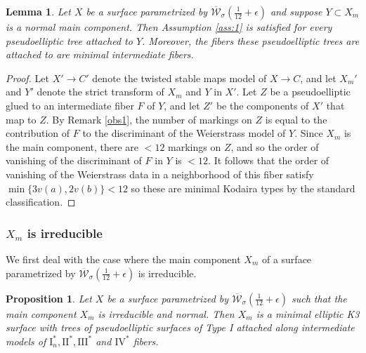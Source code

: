 \documentclass[11pt]{amsart}
\newtheorem{lemma}[theorem]{Lemma}
\newtheorem{prop}[theorem]{Proposition}
\theoremstyle{definition}
\theoremstyle{remark}
\newcommand{\calW}{\mathcal W}
\newcommand{\ktwelve}{\overline{\calW}_\sigma({\frac{1}{12}+\epsilon})}
\begin{document}
	
	\begin{lemma}\label{lem:sing:noass1} Let $X$ be a surface parametrized by $\ktwelve$ and suppose $Y \subset X_m$ is a normal main component. Then Assumption \ref{ass:1} is satisfied for every pseudoelliptic tree attached to $Y$. Moreover, the fibers these pseudoelliptic trees are attached to are minimal intermediate fibers. 
	\end{lemma} 
	\begin{proof} 
		Let $X' \to C'$ denote the twisted stable maps model of $X \to C$, and let $X_m'$ and $Y'$ denote the strict transform of $X_m$ and $Y$ in $X'$. Let $Z$ be a pseudoelliptic glued to an intermediate fiber $F$ of $Y$, and let $Z'$ be the components of $X'$ that map to $Z$. By Remark \ref{obs1}, the number of markings on $Z$ is equal to the contribution of $F$ to the discriminant of the Weierstrass model of $Y$. Since $X_m$ is the main component, there are   $< 12$ markings on $Z$, and so the order of vanishing of the discriminant of $F$ in $Y$ is $<12$. It follows that the order of vanishing of the Weierstrass data in a neighborhood of this fiber satisfy $\min\{3v(a), 2v(b)\} < 12$ so these are minimal Kodaira types by the standard classification. \end{proof}
	
	
	\subsubsection{$X_m$ is irreducible} We first deal with the case where the main component $X_m$ of a surface parametrized by $\ktwelve$ is irreducible. 
	
	\begin{prop}\label{prop:singlenormal12}
		Let $X$ be a surface parametrized by $\ktwelve$ such that the main component $X_m$ is irreducible and normal. Then $X_m$ is a minimal elliptic K3 surface with trees of pseudoelliptic surfaces of Type I attached along intermediate models of $\mathrm{I}_n^*, \mathrm{II}^*, \mathrm{III}^*$ and $\mathrm{IV}^*$ fibers. 
	\end{prop}
	
\end{document}
